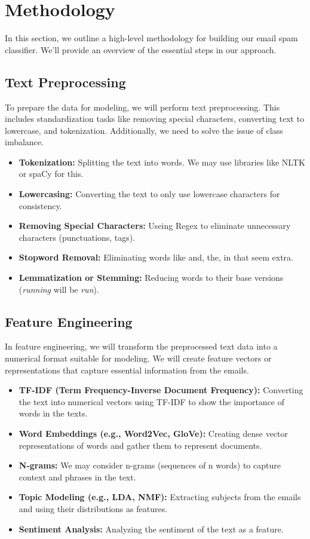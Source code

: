 \documentclass[conference]{IEEEtran}
\begin{document}
\section{Methodology}
In this section, we outline a high-level methodology for building our email spam classifier. We'll provide an overview of the essential steps in our approach.

\subsection{Text Preprocessing}
To prepare the data for modeling, we will perform text preprocessing. This includes standardization tasks like removing special characters, converting text to lowercase, and tokenization. Additionally, we need to solve the issue of class imbalance.

\begin{itemize}
    \item \textbf{Tokenization:} Splitting the text into words. We may use libraries like NLTK or spaCy for this.
    \item \textbf{Lowercasing:} Converting the text to only use lowercase characters for consistency.
    \item \textbf{Removing Special Characters:} Useing Regex to eliminate unnecessary characters (punctuations, tags).
    \item \textbf{Stopword Removal:} Eliminating words like and, the, in that seem extra.
    \item \textbf{Lemmatization or Stemming:} Reducing words to their base versions (\textit{running} will be \textit{run}).
\end{itemize}

\subsection{Feature Engineering}
In feature engineering, we will transform the preprocessed text data into a numerical format suitable for modeling. We will create feature vectors or representations that capture essential information from the emails.

\begin{itemize}
    \item \textbf{TF-IDF (Term Frequency-Inverse Document Frequency):} Converting the text into numerical vectors using TF-IDF to show the importance of words in the texts.
    \item \textbf{Word Embeddings (e.g., Word2Vec, GloVe):} Creating dense vector representations of words and gather them to represent documents.
    \item \textbf{N-grams:} We may consider n-grams (sequences of n words) to capture context and phrases in the text.
    \item \textbf{Topic Modeling (e.g., LDA, NMF):} Extracting subjects from the emails and using their distributions as features.
    \item \textbf{Sentiment Analysis:} Analyzing the sentiment of the text as a feature.
\end{itemize}
\end{document}

